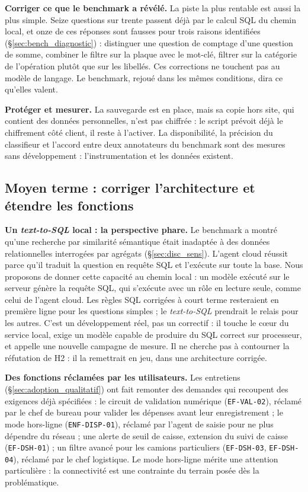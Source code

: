 \textbf{Corriger ce que le benchmark a révélé.} La piste la plus rentable est aussi la plus simple. Seize questions sur trente passent déjà par le calcul SQL du chemin local, et onze de ces réponses sont fausses pour trois raisons identifiées (§\ref{sec:bench_diagnostic}) : distinguer une question de comptage d'une question de somme, combiner le filtre sur la plaque avec le mot-clé, filtrer sur la catégorie de l'opération plutôt que sur les libellés. Ces corrections ne touchent pas au modèle de langage. Le benchmark, rejoué dans les mêmes conditions, dira ce qu'elles valent.

\textbf{Protéger et mesurer.} La sauvegarde est en place, mais sa copie hors site, qui contient des données personnelles, n'est pas chiffrée : le script prévoit déjà le chiffrement côté client, il reste à l'activer. La disponibilité, la précision du classifieur et l'accord entre deux annotateurs du benchmark sont des mesures sans développement : l'instrumentation et les données existent.

\subsection{Moyen terme : corriger l'architecture et étendre les fonctions}
\label{sec:persp_moyen}

\textbf{Un \textit{text-to-SQL} local : la perspective phare.} Le benchmark a montré qu'une recherche par similarité sémantique était inadaptée à des données relationnelles interrogées par agrégats (§\ref{sec:disc_sens}). L'agent cloud réussit parce qu'il traduit la question en requête SQL et l'exécute sur toute la base. Nous proposons de donner cette capacité au chemin local : un modèle exécuté sur le serveur génère la requête SQL, qui s'exécute avec un rôle en lecture seule, comme celui de l'agent cloud. Les règles SQL corrigées à court terme resteraient en première ligne pour les questions simples ; le \textit{text-to-SQL} prendrait le relais pour les autres. C'est un développement réel, pas un correctif : il touche le cœur du service local, exige un modèle capable de produire du SQL correct sur processeur, et appelle une nouvelle campagne de mesure. Il ne cherche pas à contourner la réfutation de H2 : il la remettrait en jeu, dans une architecture corrigée.

\textbf{Des fonctions réclamées par les utilisateurs.} Les entretiens (§\ref{sec:adoption_qualitatif}) ont fait remonter des demandes qui recoupent des exigences déjà spécifiées : le circuit de validation numérique (\texttt{EF-VAL-02}), réclamé par le chef de bureau pour valider les dépenses avant leur enregistrement ; le mode hors-ligne (\texttt{ENF-DISP-01}), réclamé par l'agent de saisie pour ne plus dépendre du réseau ; une alerte de seuil de caisse, extension du suivi de caisse (\texttt{EF-DSH-01}) ; un filtre avancé pour les camions particuliers (\texttt{EF-DSH-03}, \texttt{EF-DSH-04}), réclamé par le chef logistique. Le mode hors-ligne mérite une attention particulière : la connectivité est une contrainte du terrain posée dès la problématique.

